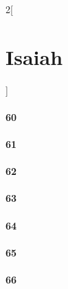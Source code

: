 \documentclass{book}
\begin{document}
\begin{multicols}{2}[\part{Isaiah}]
\subsection*{60}
\subsection*{61}
\subsection*{62}
\subsection*{63}
\subsection*{64}
\subsection*{65}
\subsection*{66}
\end{multicols}
\end{document}
